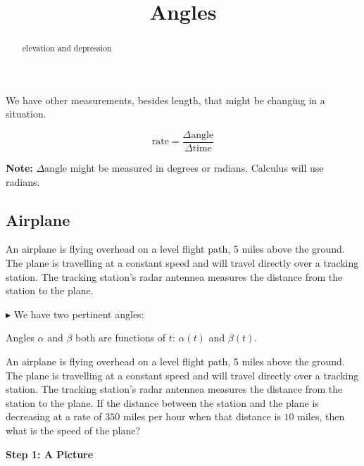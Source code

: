 \documentclass{ximera}
\title{Angles}
\begin{document}
\begin{abstract}
elevation and depression
\end{abstract}
\maketitle


We have other measurements, besides length, that might be changing in a situation.




\[
\text{rate} = \frac{\Delta \text{angle}}{\Delta \text{time}} 
\]

\textbf{Note:} $\Delta \text{angle}$ might be measured in degrees or radians. Calculus will use radians.\\






\subsection{Airplane}

An airplane is flying overhead on a level flight path, 5 miles above the ground.  The plane is travelling at a constant speed and will travel directly over a tracking station. The tracking station's radar antennea measures the distance from the station to the plane.







$\blacktriangleright$ We have two pertinent angles:

Angles $\alpha$ and $\beta$ both are functions of $t$: $\alpha(t)$ and $\beta(t)$.







An airplane is flying overhead on a level flight path, 5 miles above the ground.  The plane is travelling at a constant speed and will travel directly over a tracking station. The tracking station's radar antennea measures the distance from the station to the plane. If the distance between the station and the plane is decreasing at a rate of $350$ miles per hour when that distance is $10$ miles, then what is the speed of the plane?








\textbf{\textcolor{purple!85!blue}{Step 1: A Picture}}
\end{document}
